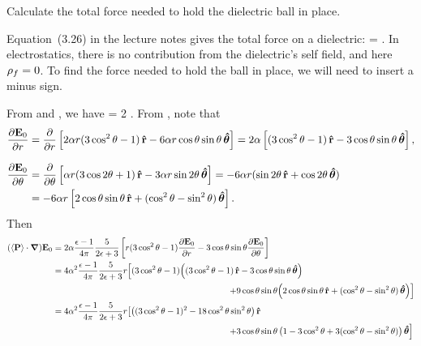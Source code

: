 \newcommand{\vF}{\vb{F}}

\begin{problem}
	Calculate the total force needed to hold the dielectric ball in place.
\end{problem}

\begin{solution}
	Equation~(3.26) in the lecture notes gives the total force on a dielectric:
	\beq
		\vF = \int [\evrhof\! \vEo + (\evP \cdot \grad) \vEo] \dcx.
	\eeq
	In electrostatics, there is no contribution from the dielectric's self field, and here $\rho_f = 0$.  To find the force needed to hold the ball in place, we will need to insert a minus sign.
	
	From  and , we have
	\beq
		\evP \cdot \grad = 2\alp {}  .
	\eeq
	From , note that
	\begin{align*}
		\pdv{\vb{E}_0}{r} &= \pdv{}{r} \left[ 2 \alpha r (3 \cos^2\theta - 1) \,\vb{\hat{r}} - 6 \alpha r \cos\theta \sin\theta \,\boldsymbol{\hat{\theta}} \right]
		= 2 \alpha \left[ (3 \cos^2\theta - 1) \,\vb{\hat{r}} - 3 \cos\theta \sin\theta \,\boldsymbol{\hat{\theta}} \right], \\[2ex]
		\pdv{\vb{E}_0}{\theta} &= \pdv{}{\theta} \left[ \alpha r (3 \cos2\theta + 1) \,\vb{\hat{r}} - 3 \alpha r \sin2\theta \,\boldsymbol{\hat{\theta}} \right]
		= -6\alpha r (\sin2\theta \,\vb{\hat{r}} + \cos2\theta \,\boldsymbol{\hat{\theta}}) \\
		&= -6 \alpha r \left[ 2 \cos\theta \sin\theta \,\vb{\hat{r}} + (\cos^2\theta - \sin^2\theta) \,\boldsymbol{\hat{\theta}} \right].
	\end{align*}
	Then
	\begin{align*}
		(\evP \cdot \grad) \vEo &= 2\alp \frac{\eps - 1}{4\pi} \frac{5}{2\eps + 3} \left[ r (3 \cos^2\tht - 1) \pdv{\vEo}{r} - 3 \cost \sint \pdv{\vEo}{\tht} \right] \\
		&= 4\alp^2  \frac{\eps - 1}{4\pi} \frac{5}{2\eps + 3} r \!\left[ (3 \cos^2\tht - 1) \!\left( (3 \cos^2\tht - 1) \,\rh - 3 \cost \sint \,\thh \right)\! \right. \\
		&\phantom{mmmmmmmmmmmmmmmmmmmmmmm} \left. + 9 \cost \sint \!\left( 2 \cost \sint \,\rh + (\cos^2\tht - \sin^2\tht) \,\thh \right) \right] \\
		&= 4\alp^2  \frac{\eps - 1}{4\pi} \frac{5}{2\eps + 3} r \!\left[ \left( (3 \cos^2\tht - 1)^2 - 18 \cos^2\tht \sin^2\tht \right) \rh \right. \\
		&\phantom{mmmmmmmmmmmmmmmmmmmmmmm} \left. + 3 \cost \sint \left( 1 - 3\cos^2\tht + 3 (\cos^2\tht - \sin^2\tht) \right) \thh \right] \\

\end{align*}
\end{solution}

